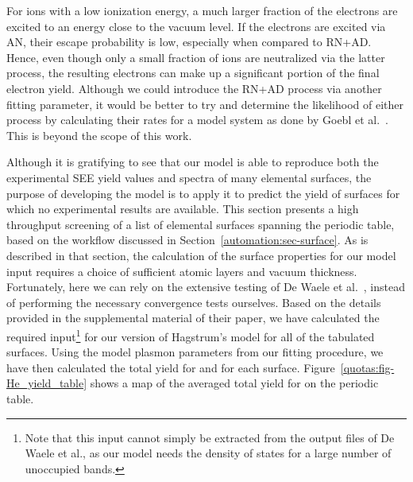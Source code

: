 \begin{refsection}
For ions with a low ionization energy, a much larger fraction of the electrons 
are excited to an energy close to the vacuum level. If the electrons are 
excited via AN, their escape probability is low, especially when compared to 
RN+AD. Hence, even though only a small fraction of ions are neutralized via 
the latter process, the resulting electrons can make up a significant portion 
of the final electron yield. Although we could introduce the RN+AD process via 
another fitting parameter, it would be better to try and determine the 
likelihood of either process by calculating their rates for a model system as 
done by Goebl et al.~\cite{Goebl2011}. This is beyond the scope of this work.


Although it is gratifying to see that our model is able to reproduce both the 
experimental SEE yield values and spectra of many elemental surfaces, the 
purpose of developing the model is to apply it to predict the yield of 
surfaces for which no experimental results are available. This section
presents a high throughput screening of a list of elemental surfaces 
spanning the periodic table, based on the workflow discussed in 
Section~\ref{automation:sec-surface}. As is described in that section, the 
calculation of the surface properties for our model input requires a choice of 
sufficient atomic layers and vacuum thickness. Fortunately, here we can rely
on the extensive testing of De Waele et al.~\cite{DeWaele2016}, instead of 
performing the necessary convergence tests ourselves. Based on the details 
provided in the supplemental material of their paper, we have calculated 
the required input\footnote{Note that this input cannot simply be extracted
from the output files of De Waele et al., as our model needs the density of 
states for a large number of unoccupied bands.} for our version of Hagstrum's 
model for all of the tabulated surfaces.
Using the model plasmon parameters from our fitting 
procedure, we have then calculated the total yield for  and 
for each surface. Figure~\ref{quotas:fig-He_yield_table} shows a map of the 
averaged total yield for  on the periodic table.  
 

\end{refsection}
